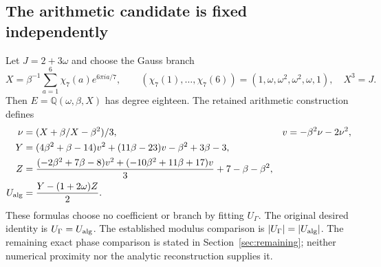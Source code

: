 \documentclass[11pt]{article}
\theoremstyle{definition}\newtheorem{definition}[theorem]{Definition}
\theoremstyle{remark}\newtheorem{remark}[theorem]{Remark}
\begin{document}
\subsection{The arithmetic candidate is fixed independently}
Let $J=2+3\omega$ and choose the Gauss branch
\[
 X=\beta^{-1}\sum_{a=1}^{6}\chi_7(a)e^{6\pi ia/7},\qquad
 (\chi_7(1),\ldots,\chi_7(6))=(1,\omega,\omega^2,\omega^2,\omega,1),\quad X^3=J.
\]
Then $E=\mathbb Q(\omega,\beta,X)$ has degree eighteen. The retained arithmetic construction defines
\begin{align*}
 \nu&=(X+\beta/X-\beta^2)/3,&v&=-\beta^2\nu-2\nu^2,\\
 Y&=(4\beta^2+\beta-14)v^2+(11\beta-23)v-\beta^2+3\beta-3,\\
 Z&=\frac{(-2\beta^2+7\beta-8)v^2+(-10\beta^2+11\beta+17)v}{3}
       +7-\beta-\beta^2,\\
 U_{\rm alg}&=\frac{Y-(1+2\omega)Z}{2}.
\end{align*}
These formulas choose no coefficient or branch by fitting $U_\Gamma$. The original desired identity is $U_\Gamma=U_{\rm alg}$. The established modulus comparison is $|U_\Gamma|=|U_{\rm alg}|$. The remaining exact phase comparison is stated in Section~\ref{sec:remaining}; neither numerical proximity nor the analytic reconstruction supplies it.










\appendix



\end{document}
